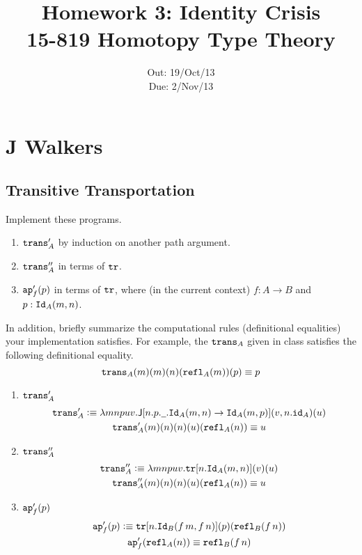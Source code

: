\documentclass[12pt]{article}
\title{\Large\textbf{
  Homework 3: Identity Crisis}
\normalsize\\
15-819 Homotopy Type Theory}
\author{}
\date{%
Out: 19/Oct/13\\
Due: 2/Nov/13
}
\newcommand{\cut}[1]{}
\newcommand{\marksolution}[1]{\color{FireBrick}#1\normalcolor}%
\newcommand{\marksolution}[1]{\cut{#1}}%
\newenvironment{solution}{\trivlist \item[\hskip \labelsep{\bf
Solution:}]}{\endtrivlist}
\begin{document}
\maketitle

\section{J Walkers}

\subsection{Transitive Transportation}

\begin{task}
  Implement these programs.
  \begin{enumerate}
    \item $\mathtt{trans}'_A$ by induction on another path argument.
    \item $\mathtt{trans}''_A$ in terms of $\mathtt{tr}$.
    \item
      $\mathtt{ap}'_f(p)$ in terms of $\mathtt{tr}$,
      where (in the current context) $f : A \to B$
      and $p : \mathtt{Id}_A(m,n)$.
  \end{enumerate}
  In addition, briefly summarize the computational rules
  (definitional equalities)
  your implementation satisfies.
  For example, the $\mathtt{trans}_A$ given in class
  satisfies the following definitional equality.
  \[
    \mathtt{trans}_A(m)(m)(n)(\mathtt{refl}_A(m))(p) \equiv p
  \]
\end{task}

\marksolution{
  \begin{solution}\mbox{}
    \begin{enumerate}
      \item $\mathtt{trans}'_A$
        \begin{gather*}
          \mathtt{trans}'_A \vcentcolon\equiv \lambda mnpuv. \mathsf{J}[n.p.\underline{\hspace{0.5em}}.\mathtt{Id}_A(m,n)\to\mathtt{Id}_A(m,p)](v,n.\mathtt{id}_A)(u)
          \\
          \mathtt{trans}'_A(m)(n)(n)(u)(\mathtt{refl}_A(n)) \equiv u
        \end{gather*}
      \item $\mathtt{trans}''_A$
        \begin{gather*}
          \mathtt{trans}''_A \vcentcolon\equiv \lambda mnpuv. \mathtt{tr}[n.\mathtt{Id}_A(m,n)](v)(u)
          \\
          \mathtt{trans}''_A(m)(n)(n)(u)(\mathtt{refl}_A(n)) \equiv u
        \end{gather*}
      \item $\mathtt{ap}'_f(p)$
        \begin{gather*}
          \mathtt{ap}'_f(p) \vcentcolon\equiv \mathtt{tr}[n.\mathtt{Id}_B(f\,m,f\,n)](p)(\mathtt{refl}_B(f\,n))
          \\
          \mathtt{ap}'_f(\mathtt{refl}_A(n)) \equiv \mathtt{refl}_B(f\,n)
        \end{gather*}
    \end{enumerate}
  \end{solution}
}
\end{document}
